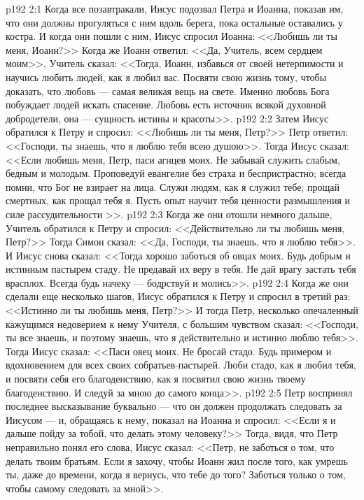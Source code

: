 \vs p192 2:1 Когда все позавтракали, Иисус подозвал Петра и Иоанна, показав им, что они должны прогуляться с ним вдоль берега, пока остальные оставались у костра. И когда они пошли с ним, Иисус спросил Иоанна: <<Любишь ли ты меня, Иоанн?>> Когда же Иоанн ответил: <<Да, Учитель, всем сердцем моим>>, Учитель сказал: <<Тогда, Иоанн, избавься от своей нетерпимости и научись любить людей, как я любил вас. Посвяти свою жизнь тому, чтобы доказать, что любовь --- самая великая вещь на свете. Именно любовь Бога побуждает людей искать спасение. Любовь есть источник всякой духовной добродетели, она --- сущность истины и красоты>>.
\vs p192 2:2 Затем Иисус обратился к Петру и спросил: <<Любишь ли ты меня, Петр?>> Петр ответил: <<Господи, ты знаешь, что я люблю тебя всею душою>>. Тогда Иисус сказал: <<Если любишь меня, Петр, паси агнцев моих. Не забывай служить слабым, бедным и молодым. Проповедуй евангелие без страха и беспристрастно; всегда помни, что Бог не взирает на лица. Служи людям, как я служил тебе; прощай смертных, как прощал тебя я. Пусть опыт научит тебя ценности размышления и силе рассудительности >>.
\vs p192 2:3 Когда же они отошли немного дальше, Учитель обратился к Петру и спросил: <<Действительно ли ты любишь меня, Петр?>> Тогда Симон сказал: <<Да, Господи, ты знаешь, что я люблю тебя>>. И Иисус снова сказал: <<Тогда хорошо заботься об овцах моих. Будь добрым и истинным пастырем стаду. Не предавай их веру в тебя. Не дай врагу застать тебя врасплох. Всегда будь начеку --- бодрствуй и молись>>.
\vs p192 2:4 Когда же они сделали еще несколько шагов, Иисус обратился к Петру и спросил в третий раз: <<Истинно ли ты любишь меня, Петр?>> И тогда Петр, несколько опечаленный кажущимся недоверием к нему Учителя, с большим чувством сказал: <<Господи, ты все знаешь, и поэтому знаешь, что я действительно и истинно люблю тебя>>. Тогда Иисус сказал: <<Паси овец моих. Не бросай стадо. Будь примером и вдохновением для всех своих собратьев\hyp{}пастырей. Люби стадо, как я любил тебя, и посвяти себя его благоденствию, как я посвятил свою жизнь твоему благоденствию. И следуй за мною до самого конца>>.
\vs p192 2:5 Петр воспринял последнее высказывание буквально --- что он должен продолжать следовать за Иисусом --- и, обращаясь к нему, показал на Иоанна и спросил: <<Если я и дальше пойду за тобой, что делать этому человеку?>> Тогда, видя, что Петр неправильно понял его слова, Иисус сказал: <<Петр, не заботься о том, что делать твоим братьям. Если я захочу, чтобы Иоанн жил после того, как умрешь ты, даже до времени, когда я вернусь, что тебе до того? Заботься только о том, чтобы самому следовать за мной>>.
